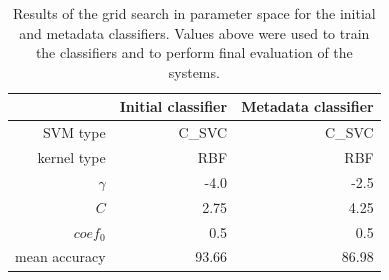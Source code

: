 \begin{table}[th!]
\centering
\begin{tabular}{@{}rrr@{}}
\toprule
& Initial classifier & Metadata classifier \\
\midrule
SVM type & C\_SVC & C\_SVC \\ 
kernel type & RBF & RBF \\
$\gamma$ & -4.0 & -2.5 \\ 
$C$ & 2.75 & 4.25 \\
$coef_0$ & 0.5 & 0.5 \\
\midrule
mean accuracy & 93.66 & 86.98 \\
\bottomrule
\end{tabular}
\caption{Results of the grid search in parameter space for the initial and metadata classifiers. Values above were used to train the classifiers and to perform final evaluation of the systems.}
\label{tab:classifier_parameters}
\end{table}

